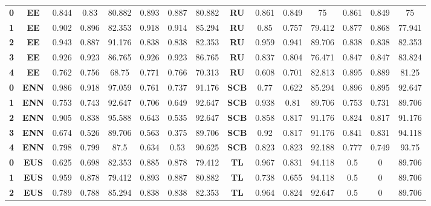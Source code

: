 {{\begin{tabular}{c|c|cccccc|ccccccc}
\textbf{0} & \textbf{EE} & 0.844 & 0.83  & 80.882 & 0.893 & 0.887 & 80.882 & \multicolumn{1}{c|}{\textbf{RU}} & 0.861 & 0.849 & 75    & 0.861 & 0.849 & 75 \\
\textbf{1} & \textbf{EE} & 0.902 & 0.896 & 82.353 & 0.918 & 0.914 & 85.294 & \multicolumn{1}{c|}{\textbf{RU}} & 0.85  & 0.757 & 79.412 & 0.877 & 0.868 & 77.941 \\
\textbf{2} & \textbf{EE} & 0.943 & 0.887 & 91.176 & 0.838 & 0.838 & 82.353 & \multicolumn{1}{c|}{\textbf{RU}} & 0.959 & 0.941 & 89.706 & 0.838 & 0.838 & 82.353 \\
\textbf{3} & \textbf{EE} & 0.926 & 0.923 & 86.765 & 0.926 & 0.923 & 86.765 & \multicolumn{1}{c|}{\textbf{RU}} & 0.837 & 0.804 & 76.471 & 0.847 & 0.847 & 83.824 \\
\textbf{4} & \textbf{EE} & 0.762 & 0.756 & 68.75 & 0.771 & 0.766 & 70.313 & \multicolumn{1}{c|}{\textbf{RU}} & 0.608 & 0.701 & 82.813 & 0.895 & 0.889 & 81.25 \\
\textbf{0} & \textbf{ENN} & 0.986 & 0.918 & 97.059 & 0.761 & 0.737 & 91.176 & \multicolumn{1}{c|}{\textbf{SCB}} & 0.77  & 0.622 & 85.294 & 0.896 & 0.895 & 92.647 \\
\textbf{1} & \textbf{ENN} & 0.753 & 0.743 & 92.647 & 0.706 & 0.649 & 92.647 & \multicolumn{1}{c|}{\textbf{SCB}} & 0.938 & 0.81  & 89.706 & 0.753 & 0.731 & 89.706 \\
\textbf{2} & \textbf{ENN} & 0.905 & 0.838 & 95.588 & 0.643 & 0.535 & 92.647 & \multicolumn{1}{c|}{\textbf{SCB}} & 0.858 & 0.817 & 91.176 & 0.824 & 0.817 & 91.176 \\
\textbf{3} & \textbf{ENN} & 0.674 & 0.526 & 89.706 & 0.563 & 0.375 & 89.706 & \multicolumn{1}{c|}{\textbf{SCB}} & 0.92  & 0.817 & 91.176 & 0.841 & 0.831 & 94.118 \\
\textbf{4} & \textbf{ENN} & 0.798 & 0.799 & 87.5  & 0.634 & 0.53  & 90.625 & \multicolumn{1}{c|}{\textbf{SCB}} & 0.823 & 0.823 & 92.188 & 0.777 & 0.749 & 93.75 \\
\textbf{0} & \textbf{EUS} & 0.625 & 0.698 & 82.353 & 0.885 & 0.878 & 79.412 & \multicolumn{1}{c|}{\textbf{TL}} & 0.967 & 0.831 & 94.118 & 0.5   & 0     & 89.706 \\
\textbf{1} & \textbf{EUS} & 0.959 & 0.878 & 79.412 & 0.893 & 0.887 & 80.882 & \multicolumn{1}{c|}{\textbf{TL}} & 0.738 & 0.655 & 94.118 & 0.5   & 0     & 89.706 \\
\textbf{2} & \textbf{EUS} & 0.789 & 0.788 & 85.294 & 0.838 & 0.838 & 82.353 & \multicolumn{1}{c|}{\textbf{TL}} & 0.964 & 0.824 & 92.647 & 0.5   & 0     & 89.706 \\

\end{tabular}}}
